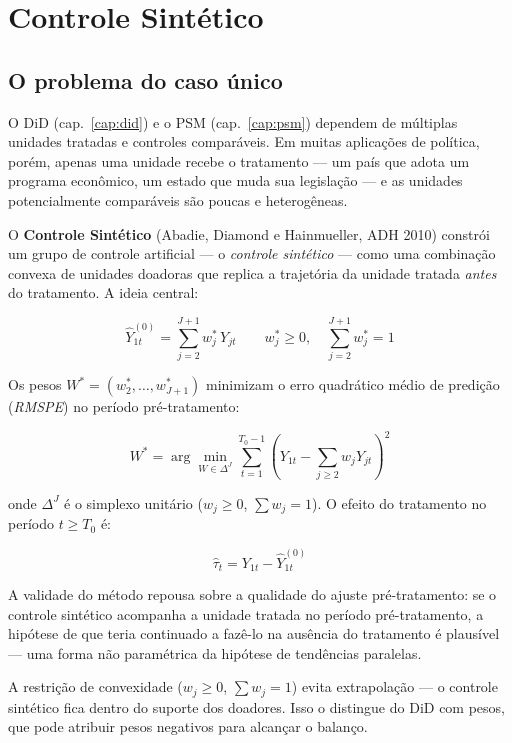 \chapter{Controle Sintético}
\label{cap:synth}

\section{O problema do caso único}

O DiD (cap.~\ref{cap:did}) e o PSM (cap.~\ref{cap:psm}) dependem de múltiplas
unidades tratadas e controles comparáveis. Em muitas aplicações de política,
porém, apenas uma unidade recebe o tratamento — um país que adota um programa
econômico, um estado que muda sua legislação — e as unidades potencialmente
comparáveis são poucas e heterogêneas.

O \textbf{Controle Sintético} (Abadie, Diamond e Hainmueller, ADH 2010)
constrói um grupo de controle artificial — o \emph{controle sintético} — como
uma combinação convexa de unidades doadoras que replica a trajetória da unidade
tratada \emph{antes} do tratamento. A ideia central:

\[
  \hat{Y}_{1t}^{(0)} = \sum_{j=2}^{J+1} w_j^*\, Y_{jt}
  \qquad
  w_j^* \geq 0,\quad \sum_{j=2}^{J+1} w_j^* = 1
\]

Os pesos $W^* = (w_2^*,\ldots,w_{J+1}^*)$ minimizam o erro quadrático médio
de predição (\emph{RMSPE}) no período pré-tratamento:

\[
  W^* = \arg\min_{W \in \Delta^J}
  \sum_{t=1}^{T_0-1} \left( Y_{1t} - \sum_{j\geq 2} w_j Y_{jt} \right)^2
\]

onde $\Delta^J$ é o simplexo unitário ($w_j \geq 0$, $\sum w_j = 1$). O efeito
do tratamento no período $t \geq T_0$ é:

\[
  \hat\tau_t = Y_{1t} - \hat{Y}_{1t}^{(0)}
\]

A validade do método repousa sobre a qualidade do ajuste pré-tratamento:
se o controle sintético acompanha a unidade tratada no período pré-tratamento,
a hipótese de que teria continuado a fazê-lo na ausência do tratamento é
plausível — uma forma não paramétrica da hipótese de tendências paralelas.

\begin{nota}
  A restrição de convexidade ($w_j \geq 0$, $\sum w_j = 1$) evita
  extrapolação — o controle sintético fica dentro do suporte dos doadores.
  Isso o distingue do DiD com pesos, que pode atribuir pesos negativos para
  alcançar o balanço.
\end{nota}

